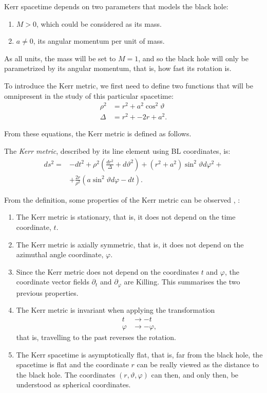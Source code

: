 Kerr spacetime depends on two parameters that models the black hole:
\begin{enumerate}
	\item $M > 0$, which could be considered as its mass.
	\item $a \neq 0$, its angular momentum per unit of mass.
\end{enumerate}

As all units, the mass will be set to $M = 1$, and so the black hole will only be parametrized by its angular momentum, that is, how fast its rotation is.

To introduce the Kerr metric, we first need to define two functions that will be omnipresent in the study of this particular spacetime:
\begin{align}
	\rho^2 &= r^2 + a^2\cos^2\vartheta \\
	\Delta &= r^2 + -2r + a^2.
\end{align}

From these equations, the Kerr metric is defined as follows.
\begin{definition}
	The \emph{Kerr metric}, described by its line element using \ac{BL} coordinates, is:
	\begin{align}
		\label{eq:kerrmetric}
		ds^2 = &-dt^2 + \rho^2\left(\frac{dr^2}{\Delta} + d\vartheta^2\right) + \left(r^2 + a^2\right)\sin^2\vartheta d\varphi^2 + \\
		\nonumber
		&+ \frac{2r}{\rho^2}\left(a\sin^2\vartheta d\varphi - dt\right).
	\end{align}
\end{definition}

From the definition, some properties of the Kerr metric can be observed \cite[Sec. 2.1]{galindo14}, \cite[pp. 58-59]{oneill95}:
\begin{enumerate}
	\item The Kerr metric is stationary, that is, it does not depend on the time coordinate, $t$.
	\item The Kerr metric is axially symmetric, that is, it does not depend on the azimuthal angle coordinate, $\varphi$.
	\item Since the Kerr metric does not depend on the coordinates $t$ and $\varphi$, the coordinate vector fields $\partial_t$ and $\partial_\varphi$ are Killing. This summarises the two previous properties.
	\item The Kerr metric is invariant when applying the transformation
	\begin{align*}
		t &\to -t \\
		\varphi &\to -\varphi,
	\end{align*}
	that is, travelling to the past reverses the rotation.
	\item The Kerr spacetime is asymptotically flat, that is, far from the black hole, the spacetime is flat and the coordinate $r$ can be really viewed as the distance to the black hole. The coordinates $(r, \vartheta, \varphi)$ can then, and only then, be understood as spherical coordinates.
\end{enumerate}

